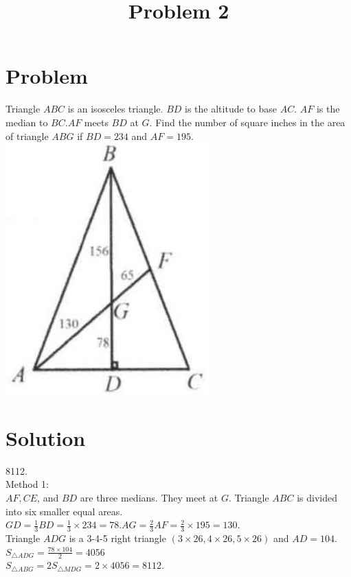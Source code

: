 \documentclass{article}
\title{Problem 2}
\date{}
\begin{document}
\maketitle

\section*{Problem}
Triangle \(A B C\) is an isosceles triangle. \(B D\) is the altitude to base \(A C\). \(A F\) is the median to \(B C . A F\) meets \(B D\) at \(G\). Find the number of square inches in the area of triangle \(A B G\) if \(B D=234\) and \(A F=195\).\\
\centering
\includegraphics[width=\textwidth]{images/problem_image_1.jpg}

\section*{Solution}
8112.\\
Method 1:\\
\(A F, C E\), and \(B D\) are three medians. They meet at \(G\). Triangle \(A B C\) is divided into six smaller equal areas. \(G D=\frac{1}{3} B D=\frac{1}{3} \times 234=78 . A G=\frac{2}{3} A F=\frac{2}{3} \times 195=130\).\\
Triangle \(A D G\) is a 3-4-5 right triangle \((3 \times 26,4 \times 26,5 \times 26)\) and \(A D=104\).\\
\(S_{\triangle A D G}=\frac{78 \times 104}{2}=4056\)\\
\(S_{\triangle A B G}=2 S_{\triangle M D G}=2 \times 4056=8112\).
\end{document}
